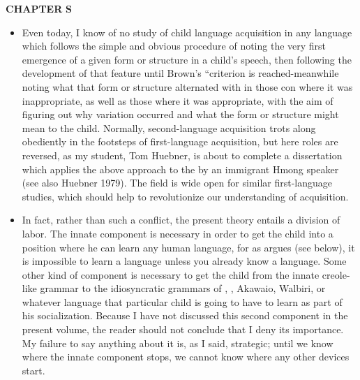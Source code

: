 \begin{itemize}
\begin{itemize}
\begin{itemize}
\begin{itemize}
\begin{itemize}
\begin{itemize}
\begin{itemize}
\textbf{CHAPTER} \textbf{S}

\begin{itemize}
\item Even today, I know of no study of child language acquisition in any language which follows the simple and obvious procedure of noting the very first emergence of a given form or structure in a child's speech, then following the development of that feature until Brown's ``criterion is reached-meanwhile noting what that form or structure alternated with in those con where it was inappropriate, as well as those where it was appropriate, with the aim of figuring out why variation occurred and what the form or structure might mean to the child. Normally, second-language acquisition trots along obediently in the footsteps of first-language acquisition, but here roles are reversed, as my student, Tom Huebner, is about to complete a dissertation which applies the above approach to the   by an immi\-grant Hmong speaker (see also Huebner 1979). The field is wide open for similar first-language studies, which should help to revolutionize our understanding of acquisition.
\item In fact, rather than such a conflict, the present theory entails a division of labor. The innate component is necessary in order to get the child into a position where he can learn any human language, for as \citet{Fodor1975} argues (see below), it is impossible to learn a language unless you already know a language. Some other kind of component is necessary to get the child from the innate creole-like grammar to the idiosyncratic grammars of , , Akawaio, Walbiri, or what\-ever language that particular child is going to have to learn as part of his socialization. Because I have not discussed this second component in the present volume, the reader should not conclude that I deny its importance. My failure to say anything about it is, as I said, strategic; until we know where the innate component stops, we cannot know where any other devices start.


\end{itemize}
\end{itemize}
\end{itemize}
\end{itemize}
\end{itemize}
\end{itemize}
\end{itemize}
\end{itemize}
